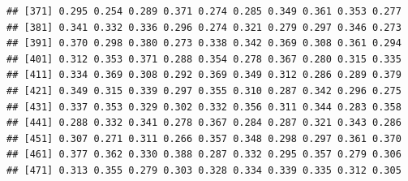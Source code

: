 \documentclass[
]{article}
\begin{document}
\begin{verbatim}
## [371] 0.295 0.254 0.289 0.371 0.274 0.285 0.349 0.361 0.353 0.277
## [381] 0.341 0.332 0.336 0.296 0.274 0.321 0.279 0.297 0.346 0.273
## [391] 0.370 0.298 0.380 0.273 0.338 0.342 0.369 0.308 0.361 0.294
## [401] 0.312 0.353 0.371 0.288 0.354 0.278 0.367 0.280 0.315 0.335
## [411] 0.334 0.369 0.308 0.292 0.369 0.349 0.312 0.286 0.289 0.379
## [421] 0.349 0.315 0.339 0.297 0.355 0.310 0.287 0.342 0.296 0.275
## [431] 0.337 0.353 0.329 0.302 0.332 0.356 0.311 0.344 0.283 0.358
## [441] 0.288 0.332 0.341 0.278 0.367 0.284 0.287 0.321 0.343 0.286
## [451] 0.307 0.271 0.311 0.266 0.357 0.348 0.298 0.297 0.361 0.370
## [461] 0.377 0.362 0.330 0.388 0.287 0.332 0.295 0.357 0.279 0.306
## [471] 0.313 0.355 0.279 0.303 0.328 0.334 0.339 0.335 0.312 0.305
\end{verbatim}
\end{document}
